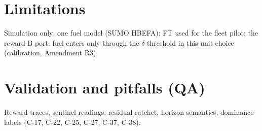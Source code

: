 \documentclass[11pt]{article}
\begin{document}
\section{Limitations}
Simulation only; one fuel model (SUMO HBEFA); FT used for the fleet pilot; the reward-B port: fuel enters only through the $\delta$
threshold in this unit choice (calibration, Amendment R3).

\appendix
\section{Validation and pitfalls (QA)}
Reward traces, sentinel readings, residual ratchet, horizon semantics, dominance labels (C-17, C-22, C-25, C-27, C-37, C-38).
\end{document}
